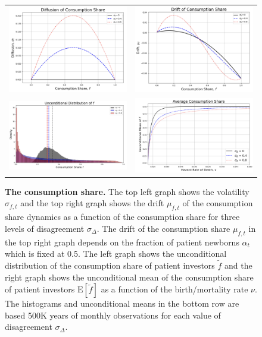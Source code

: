 \documentclass[preprint,11pt,authoryear]{elsarticle}
\theoremstyle{plain}
\begin{document}
\begin{figure}[htbp]
\centering
\vspace{0.1in}
\begin{tabular}{cc}
\includegraphics[width=.3\textwidth]{figuresJFE/ConsumptionShareDiffusion.png} &
\includegraphics[width=.3\textwidth]{figuresJFE/ConsumptionShareDrift.png} \\
\includegraphics[width=.3\textwidth]{figuresJFE/HistConsumptionShare.png} &
\includegraphics[width=.3\textwidth]{figuresJFE/AverageConsumptionShare.png}
\end{tabular}
\caption{\textbf{The consumption share.} \footnotesize{The top left graph shows the volatility $\sigma_{f,t}$ and the top right graph shows the drift $\mu_{f,t}$ of the consumption share dynamics as a function of the consumption share for three levels of disagreement $\sigma_{\Delta}$. The drift of the consumption share $\mu_{f,t}$ in the top right graph depends on the fraction of patient newborns $\alpha_t$ which is fixed at 0.5. The left graph shows the unconditional distribution of the consumption share of patient investors $\tilde{f}$ and the right graph shows the unconditional mean of the consumption share of patient investors $\mathrm{E}[\tilde{f}]$ as a function of the birth/mortality rate $\nu$. The histograms and unconditional means in the bottom row are based 500K years of monthly observations for each value of disagreement $\sigma_{\Delta}$.}} \label{fig:ConsumptionShare} 
\end{figure}
\end{document}
